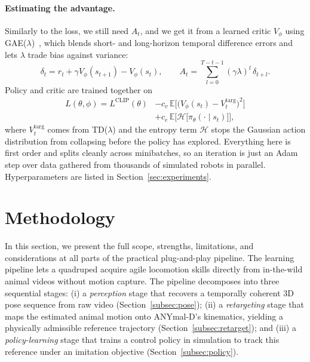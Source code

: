 \documentclass{article}
\theoremstyle{plain}
\theoremstyle{definition}
\theoremstyle{remark}
\begin{document}
\paragraph{Estimating the advantage.}
Similarly to the loss, we still need $A_t$, and we get it from a learned critic $V_\phi$ using
GAE($\lambda$)~\cite{schulman2016gae}, which blends short- and long-horizon
temporal difference errors and lets $\lambda$ trade bias against variance:
\begin{equation}
    \delta_t = r_t + \gamma V_\phi(s_{t+1}) - V_\phi(s_t),
    \qquad
    A_t = \sum_{l=0}^{T-t-1} (\gamma \lambda)^l\, \delta_{t+l}.
\end{equation}
Policy and critic are trained together on
\begin{equation}
\begin{split}
    L(\theta, \phi)
        = L^{\text{CLIP}}(\theta)
        &- c_v\, \mathbb{E}\big[ \big( V_\phi(s_t) - V_t^{\text{targ}} \big)^2 \big] \\
        &+ c_e\, \mathbb{E}\big[ \mathcal{H}\big[ \pi_\theta(\cdot \mid s_t) \big] \big],
\end{split}
\end{equation}
where $V_t^{\text{targ}}$ comes from TD($\lambda$) and the entropy term
$\mathcal{H}$ stops the Gaussian action distribution from collapsing before the
policy has explored. Everything here is first order and splits cleanly across
minibatches, so an iteration is just an Adam step over data gathered from
thousands of simulated robots in parallel. Hyperparameters are listed in
Section~\ref{sec:experiments}. %

\section{Methodology}

In this section, we present the full scope, strengths, limitations, and considerations at all parts of the practical plug-and-play pipeline. The learning pipeline lets a quadruped acquire agile locomotion skills directly from in-the-wild animal videos without motion capture. The pipeline decomposes into three sequential stages: (i) a \emph{perception} stage that recovers a temporally coherent 3D pose sequence from raw video (Section~\ref{subsec:pose}); (ii) a
\emph{retargeting} stage that maps the estimated animal motion onto ANYmal-D's kinematics, yielding a physically admissible reference trajectory (Section~\ref{subsec:retarget}); and (iii) a \emph{policy-learning} stage that
trains a control policy in simulation to track this reference under an imitation objective (Section~\ref{subsec:policy}).
\end{document}

